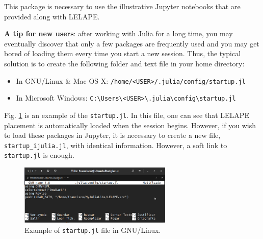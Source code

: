 This package is necessary to use the illustrative Jupyter notebooks that are provided along with LELAPE.

\textbf{A tip for new users}: after working with Julia for a long time, you may eventually discover that only a few packages are frequently used and  you may get bored of loading them every time you start a new session. Thus, the typical solution is to create the following folder and text file in your home directory:
%
\begin{itemize}
	\item In GNU/Linux \& Mac OS X: \texttt{/home/<USER>/.julia/config/startup.jl}
	\item In Microsoft Windows: \texttt{C:{\textbackslash}Users{\textbackslash}<USER>{\textbackslash}.julia{\textbackslash}config{\textbackslash}startup.jl}
\end{itemize}  
%
Fig. \ref{Fig:startup.jl} is an example of the \texttt{startup.jl}. In this file, one can see that LELAPE placement is automatically loaded when the session begins. However, if you wish to load these packages in Jupyter, it is necessary to create a new file, \texttt{startup\_ijulia.jl}, with identical information. However, a soft link to \texttt{startup.jl} is enough.
%
\begin{figure}
	\centering
	\includegraphics[width=0.65\textwidth]{fig/startup.jl}
	\caption{Example of \texttt{startup.jl} file in GNU/Linux.}
	\label{Fig:startup.jl}
\end{figure} 